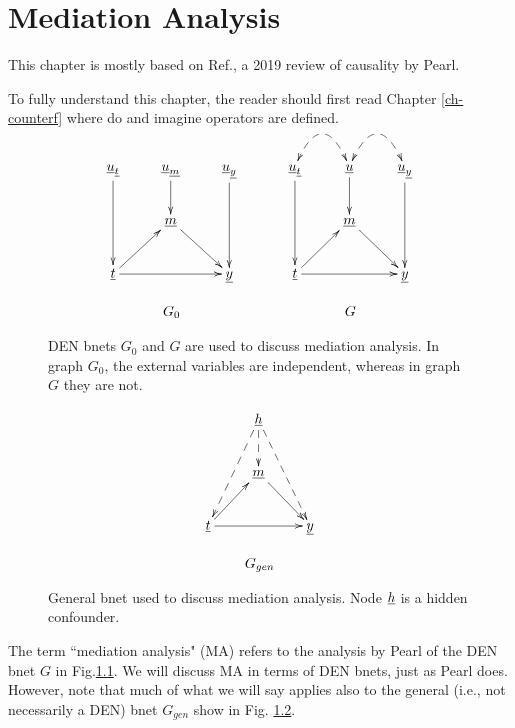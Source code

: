 \chapter{Mediation Analysis}
\label{ch-mediation}
This chapter is mostly based on 
Ref.\cite{pearl-2019review}, a 2019
 review of causality by Pearl.

To fully
understand this chapter,
the reader should first read Chapter \ref{ch-counterf}
where do and imagine operators are defined.


\begin{figure}[h!]
$$
\begin{array}{ccc}
\\
\xymatrix{
\rvu_\rvt\ar[dd]
&\rvu_\rvm\ar[d]
&\rvu_\rvy\ar[dd]
\\
&\rvm\ar[rd]
\\
\rvt\ar[ru]\ar[rr]&&\rvy
}
&\;\;\;\;&
\xymatrix{
\rvu_\rvt\ar[dd]\ar@/^2pc/@{<-->}[r]
&\rvu\ar[d]\ar@/^2pc/@{<-->}[r]
&\rvu_\rvy\ar[dd]
\\
&\rvm\ar[rd]
\\
\rvt\ar[ru]\ar[rr]&&\rvy
}
\\
\\
G_0&&G
\end{array}
$$
\caption{DEN bnets $G_0$ and $G$
are used to 
discuss mediation analysis.
In graph
$G_0$,
the external
variables are independent,
whereas in graph $G$
they are not.}
\label{fig-mediation-bnets}
\end{figure}

\begin{figure}[h!]
$$
\begin{array}{c}
\xymatrix{
&\rvh
\ar@{-->}[d]
\ar@{-->}[ldd]
\ar@{-->}[rdd]
\\
&\rvm\ar[rd]
\\
\rvt\ar[ru]\ar[rr]&&\rvy
}
\\
\\
G_{gen}
\end{array}
$$
\caption{General bnet used to 
discuss mediation analysis.
Node ${\underline{h}}$ is a hidden confounder.}
\label{fig-gen-bnet-mediation}
\end{figure}

The term ``mediation analysis" (MA)
refers
to  the analysis by Pearl
of the DEN bnet
$G$
in Fig.\ref{fig-mediation-bnets}.
We will discuss MA in terms
of DEN bnets, just as Pearl does.
However, note that much of 
what we will say applies also to 
the general (i.e., not
necessarily a DEN) bnet $G_{gen}$
show in Fig. \ref{fig-gen-bnet-mediation}.



